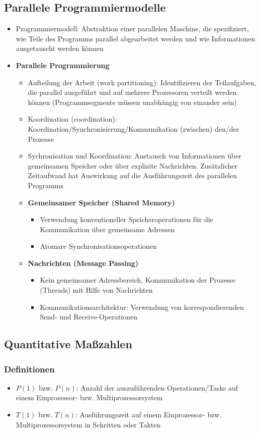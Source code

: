 \subsection{Parallele Programmiermodelle}
\begin{itemize}
	\item Programmiermodell: Abstraktion einer parallelen Maschine, die spezifiziert, wie Teile des Programms parallel abgearbeitet werden und wie Informationen ausgetauscht werden können
	\item \textbf{Parallele Programmierung}
	\begin{itemize}
		\item Aufteilung der Arbeit (work partitioning): Identifizieren der Teilaufgaben, die parallel ausgeführt und auf mehrere Prozessoren verteilt werden können (Programmsegmente müssen unabhängig von einander sein)
		\item Koordination (coordination): Koordination/Synchronisierung/Kommunikation (zwischen) den/der Prozesse
		\item Sychronisation und Koordination: Austausch von Informationen über gemeinsamen Speicher oder über explizite Nachrichten. Zusätzlicher Zeitaufwand hat Auswirkung auf die Ausführungszeit des parallelen Programms
		\item \textbf{Gemeinsamer Speicher (Shared Memory)}
		\begin{itemize}
			\item Verwendung konventioneller Speicheroperationen für die Kommunikation über gemeinsame Adressen
			\item Atomare Synchronisationsoperationen
		\end{itemize}
		\item \textbf{Nachrichten (Message Passing)}
		\begin{itemize}
			\item Kein gemeinsamer Adressbereich, Kommunikation der Prozesse (Threads) mit Hilfe von Nachrichten
			\item Kommunikationsarchitektur: Verwendung von korrespondierenden Send- und Receive-Operationen
		\end{itemize}
	\end{itemize}
\end{itemize}


\subsection{Quantitative Maßzahlen}

\subsubsection{Definitionen}
\begin{itemize}
	\item \(P(1)\) bzw. \(P(n)\): Anzahl der auszuführenden Operationen/Tasks auf einem Einprozessor- bzw. Multiprozessorsystem
	\item \(T(1)\) bzw. \(T(n)\): Ausführungszeit auf einem Einprozessor- bzw. Multiprozessorsystem in Schritten oder Takten
\end{itemize}

